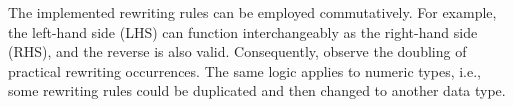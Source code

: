 The implemented rewriting rules can be employed commutatively. 
For example, the left-hand side (LHS) can function interchangeably as the right-hand side (RHS), and the reverse is also valid. 
Consequently, observe the doubling of practical rewriting occurrences. 
The same logic applies to numeric types, i.e., some rewriting rules could be duplicated and then changed to another \Wasm data type.